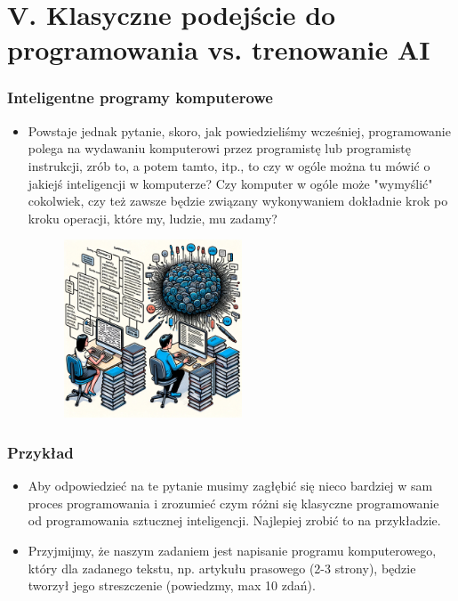 \documentclass{beamer}
\begin{document}
\section{V. Klasyczne podejście do programowania vs. trenowanie AI}

\begin{frame}[fragile]
\frametitle{Inteligentne programy komputerowe}
\begin{itemize}
\item Powstaje jednak pytanie, skoro, jak powiedzieliśmy wcześniej, programowanie polega na wydawaniu komputerowi przez programistę lub programistę instrukcji, zrób to, a potem tamto, itp., to czy w ogóle można tu mówić o jakiejś inteligencji w komputerze? Czy komputer w ogóle może "wymyślić" cokolwiek, czy też zawsze będzie związany  wykonywaniem dokładnie krok po kroku operacji, które my, ludzie, mu zadamy?

                    \begin{figure}[h]
                        \centering
                        \includegraphics[width=0.5\textwidth]{../../img/programowanie ai vs klasyczne2.png}
                    \end{figure}                    
                    \end{itemize}
\end{frame}

\begin{frame}[fragile]
\frametitle{Przykład}
\begin{itemize}
\item Aby odpowiedzieć na te pytanie musimy zagłębić się nieco bardziej w sam proces programowania i zrozumieć czym różni się klasyczne programowanie od programowania sztucznej inteligencji. Najlepiej zrobić to na przykładzie.
\item Przyjmijmy, że naszym zadaniem jest napisanie programu komputerowego, który dla zadanego tekstu, np. artykułu prasowego (2-3 strony), będzie tworzył jego streszczenie (powiedzmy, max 10 zdań). 
\end{itemize}
\end{frame}
\end{document}
